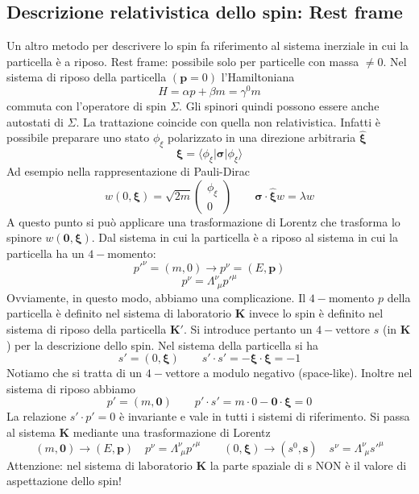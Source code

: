 \subsection{Descrizione relativistica dello spin: Rest frame}
Un altro metodo per descrivere lo spin fa riferimento al sistema inerziale in cui la particella è a riposo. Rest frame: possibile solo per particelle con massa $\not=0$. Nel sistema di riposo della particella $(\mathbf{p}=0)$ l'Hamiltoniana
$$
H=\alpha p+\beta m=\gamma^0m
$$
commuta con l'operatore di spin $\Sigma$. Gli spinori quindi possono essere anche autostati di $\Sigma$. La trattazione coincide con quella non relativistica. Infatti è possibile preparare uno stato $\phi_\xi$ polarizzato in una direzione arbitraria $\hat{\boldsymbol{\xi}}$
$$
\boldsymbol{\xi} = \langle \phi_\xi | \boldsymbol{\sigma} | \phi_\xi \rangle
$$
Ad esempio nella rappresentazione di Pauli-Dirac
$$
w(0, \boldsymbol{\xi}) = \sqrt{2m} \begin{pmatrix} \phi_\xi \\ 0 \end{pmatrix} \qquad \boldsymbol{\sigma} \cdot \hat{\boldsymbol{\xi}} w = \lambda w
$$
A questo punto si può applicare una trasformazione di Lorentz che trasforma lo spinore $w(\mathbf{0},\boldsymbol{\xi})$. Dal sistema in cui la particella è a riposo al sistema in cui la particella ha un $4-$momento:
$$
p'^\nu = (m, 0) \to p^\nu = (E, \mathbf{p})
$$
$$
p^\nu = \Lambda^\nu_{\,\,\mu} p'^\mu
$$
Ovviamente, in questo modo, abbiamo una complicazione. Il $4-$momento $p$ della particella è definito nel sistema di laboratorio $\mathbf{K}$ invece lo spin è definito nel sistema di riposo della particella $\mathbf{K}'$. Si introduce pertanto un $4-$vettore $s$ (in $\mathbf{K}$) per la descrizione dello spin. Nel sistema della particella si ha
$$
s' = (0, \boldsymbol{\xi}) \qquad s' \cdot s' = -\boldsymbol{\xi} \cdot \boldsymbol{\xi} = -1
$$
Notiamo che si tratta di un $4-$vettore a modulo negativo (space-like). Inoltre nel sistema di riposo abbiamo
$$
p' = (m, \mathbf{0}) \qquad p' \cdot s' = m \cdot 0 - \mathbf{0} \cdot \boldsymbol{\xi} = 0
$$
La relazione $s'\cdot p'=0$ è invariante e vale in tutti i sistemi di riferimento. Si passa al sistema $\mathbf{K}$ mediante una trasformazione di Lorentz
$$
(m, \mathbf{0}) \to (E, \mathbf{p}) \quad p^\nu = \Lambda^\nu_{\,\,\mu} p'^\mu \qquad (0, \boldsymbol{\xi}) \to (s^0, \mathbf{s}) \quad s^\nu = \Lambda^\nu_{\,\,\mu} s'^\mu
$$
Attenzione: nel sistema di laboratorio $\mathbf{K}$ la parte spaziale di s NON è il valore di aspettazione dello spin!

